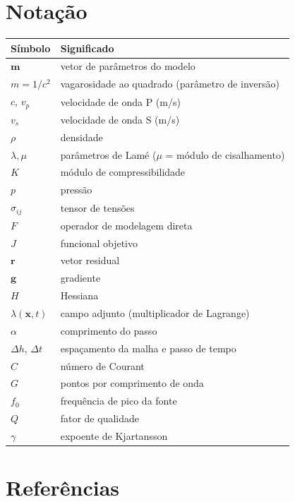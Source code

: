 \documentclass[11pt,a4paper,oneside]{report}
\begin{document}
\chapter{Notação}

\begin{center}
\begin{longtable}{@{}ll@{}}
\toprule
\textbf{Símbolo} & \textbf{Significado} \\
\midrule
\endhead
$\mathbf{m}$ & vetor de parâmetros do modelo \\
$m = 1/c^{2}$ & vagarosidade ao quadrado (parâmetro de inversão) \\
$c$, $v_p$ & velocidade de onda P (m/s) \\
$v_s$ & velocidade de onda S (m/s) \\
$\rho$ & densidade \\
$\lambda, \mu$ & parâmetros de Lamé ($\mu$ = módulo de cisalhamento) \\
$K$ & módulo de compressibilidade \\
$p$ & pressão \\
$\sigma_{ij}$ & tensor de tensões \\
$F$ & operador de modelagem direta \\
$J$ & funcional objetivo \\
$\mathbf{r}$ & vetor residual \\
$\mathbf{g}$ & gradiente \\
$H$ & Hessiana \\
$\lambda(\mathbf{x},t)$ & campo adjunto (multiplicador de Lagrange) \\
$\alpha$ & comprimento do passo \\
$\Delta h$, $\Delta t$ & espaçamento da malha e passo de tempo \\
$C$ & número de Courant \\
$G$ & pontos por comprimento de onda \\
$f_0$ & frequência de pico da fonte \\
$Q$ & fator de qualidade \\
$\gamma$ & expoente de Kjartansson \\
\bottomrule
\end{longtable}
\end{center}

\chapter{Referências}
\end{document}
